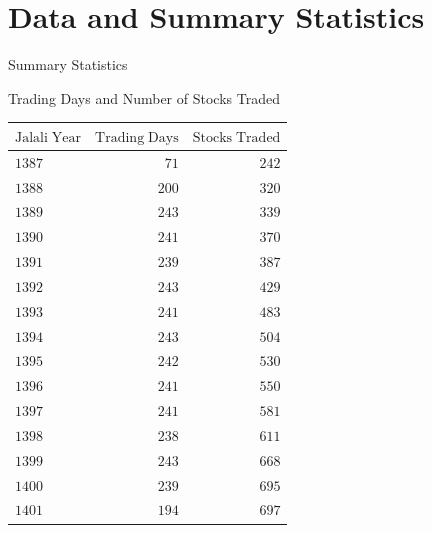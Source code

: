 \documentclass{beamer}
\begin{document}
\section{Data and Summary Statistics}

\begin{frame}
    \Huge
    \center
    Summary Statistics
\end{frame}


\begin{frame}{Trading Days and Number of Stocks Traded}
    \centering
    \fontsize{11}{13} \selectfont
    \begin{tabular}{lrr}
        \toprule
        \(\mathrm{Jalali \; Year}\) & \(\mathrm{Trading \; Days}\) & \(\mathrm{Stocks \; Traded}\) \\
        \midrule
        \(\mathrm{1387}\)           & \(\mathrm{71}\)              & \(\mathrm{242}\)              \\
        \(\mathrm{1388}\)           & \(\mathrm{200}\)             & \(\mathrm{320}\)              \\
        \(\mathrm{1389}\)           & \(\mathrm{243}\)             & \(\mathrm{339}\)              \\
        \(\mathrm{1390}\)           & \(\mathrm{241}\)             & \(\mathrm{370}\)              \\
        \(\mathrm{1391}\)           & \(\mathrm{239}\)             & \(\mathrm{387}\)              \\
        \(\mathrm{1392}\)           & \(\mathrm{243}\)             & \(\mathrm{429}\)              \\
        \(\mathrm{1393}\)           & \(\mathrm{241}\)             & \(\mathrm{483}\)              \\
        \(\mathrm{1394}\)           & \(\mathrm{243}\)             & \(\mathrm{504}\)              \\
        \(\mathrm{1395}\)           & \(\mathrm{242}\)             & \(\mathrm{530}\)              \\
        \(\mathrm{1396}\)           & \(\mathrm{241}\)             & \(\mathrm{550}\)              \\
        \(\mathrm{1397}\)           & \(\mathrm{241}\)             & \(\mathrm{581}\)              \\
        \(\mathrm{1398}\)           & \(\mathrm{238}\)             & \(\mathrm{611}\)              \\
        \(\mathrm{1399}\)           & \(\mathrm{243}\)             & \(\mathrm{668}\)              \\
        \(\mathrm{1400}\)           & \(\mathrm{239}\)             & \(\mathrm{695}\)              \\
        \(\mathrm{1401}\)           & \(\mathrm{194}\)             & \(\mathrm{697}\)              \\
        \bottomrule
    \end{tabular}
\end{frame}
\end{document}
